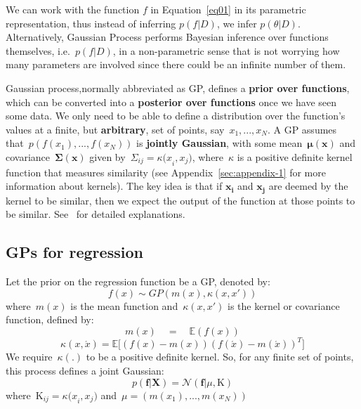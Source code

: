 \documentclass[]{IEEEtran}
\begin{document}
We can work with the function \(f\) in Equation~\ref{eq01} in its parametric representation, thus instead of inferring \(p(f|D)\), we infer \( p(\theta|D)\). Alternatively, Gaussian Process performs Bayesian inference over functions themselves, i.e.~\(p(f|D)\), in a non-parametric sense that is not worrying how many parameters are involved since there could be an infinite number of them. \par

Gaussian process,normally abbreviated as GP, deﬁnes a \textbf{prior over functions}, which can be converted into a \textbf{posterior over functions} once we have seen some data. We only need to be able to deﬁne a distribution over the function’s values at a ﬁnite, but \textbf{arbitrary}, set of points, say~\({{x}_1,...,{x}_N}\). A GP assumes that~\({p(f({x}_1),...,f({x}_N))}\)  is \textbf{jointly Gaussian}, with some mean~\(\mathbf{\mu (x)}\) and covariance~\(\mathbf{\Sigma (x)}\) given by~\({ \Sigma  }_{ ij }={ \kappa (x }_{ i },{ x }_{ j })\), where~\(\kappa\) is a positive deﬁnite kernel function that measures similarity (see Appendix~\ref{sec:appendix-1} for more information about kernels). The key idea is that if \(\mathbf{{x}_i}\) and \(\mathbf{{x}_j}\) are deemed by the kernel to be similar, then we expect the output of the function at those points to be similar. See~\cite{Ras2006} for detailed explanations.

\subsection{GPs for regression}
Let the prior on the regression function be a GP, denoted by:
\begin{equation}
f(x)\sim GP(m(x),\kappa (x, x' ))
\label{eq02}
\end{equation}
where~\(m(x)\) is the mean function and~\(\kappa (x, x')\)  is the kernel or covariance function, defined by:
\begin{equation}
m(x)\quad =\quad \mathbb{E} (f(x))
\label{eq03}
\end{equation}
\begin{equation}
\kappa (x,\acute { x } )={ \mathbb{E}[ }(f(x)-m(x))({ f(\acute { x } )-m(\acute { x } ) })^{ T }]
\label{eq04}
\end{equation}
We require~\(\kappa (.)\) to be a positive deﬁnite kernel. So, for any ﬁnite set of points, this process deﬁnes a joint Gaussian:
\begin{equation}
p(\mathbf{f}|{ \mathbf{X} })=\mathcal{N} (\mathbf{f}|\mu ,\mathbf{\mathrm{K}} )
\label{eq05}
\end{equation}
where~\({ \mathrm{K}  }_{ ij }={ \kappa (x }_{ i },{ x }_{ j })\) and~\(\mu =(m({ x }_{ 1 }),...,m({ x }_{ N }))\)
\end{document}
